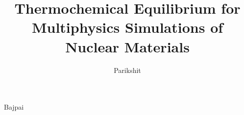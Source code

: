 \documentclass{dissertation}
\theoremstyle{definition}
\theoremstyle{remark}
\begin{document}

\title[Development of the Corrosion Modelling Application Yellowjacket]{Thermochemical Equilibrium for Multiphysics Simulations of Nuclear Materials} 
\author{Parikshit}{Bajpai}

\frontmatter








\tableofcontents

\listoffigures

\listoftables

% 
% 

\mainmatter










% 


\appendix

\thumbfalse

% 


\end{document}
